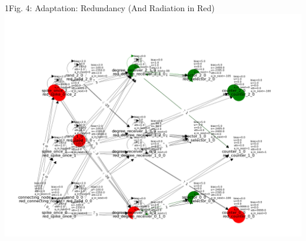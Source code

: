 {\begin{rudifig}{1\hsize}{Fig. 4: Adaptation: Redundancy (And Radiation in Red)}
    \includegraphics[width=1\linewidth]{latex/Images/rad_adapted.png}
    \label{fig:encoded_snn}
\end{rudifig}


}